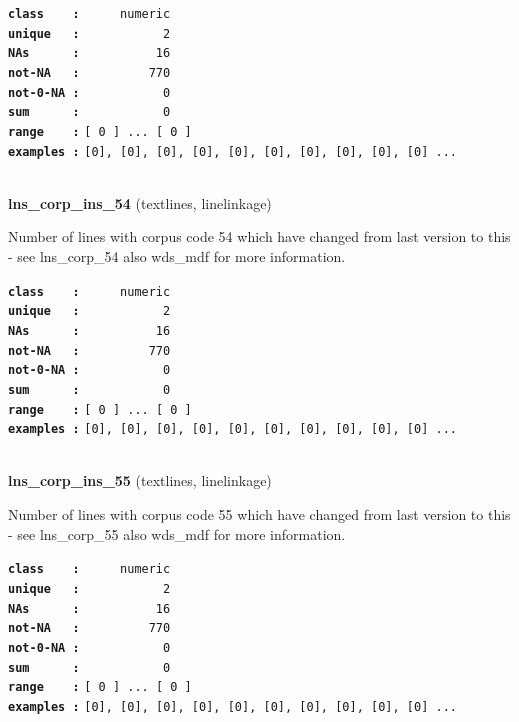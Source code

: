 \documentclass[]{article}
\begin{document}
\textbf{\texttt{class\ \ \ \ :}} \texttt{~~~~~numeric}\\
\textbf{\texttt{unique\ \ \ :}} \texttt{~~~~~~~~~~~2}\\
\textbf{\texttt{NAs\ \ \ \ \ \ :}} \texttt{~~~~~~~~~~16}\\
\textbf{\texttt{not-NA\ \ \ :}} \texttt{~~~~~~~~~770}\\
\textbf{\texttt{not-0-NA\ :}} \texttt{~~~~~~~~~~~0}\\
\textbf{\texttt{sum\ \ \ \ \ \ :}} \texttt{~~~~~~~~~~~0}\\
\textbf{\texttt{range\ \ \ \ :}}
\texttt{{[}\ 0\ {]}\ ...\ {[}\ 0\ {]}}\\
\textbf{\texttt{examples\ :}}
\texttt{{[}0{]},\ {[}0{]},\ {[}0{]},\ {[}0{]},\ {[}0{]},\ {[}0{]},\ {[}0{]},\ {[}0{]},\ {[}0{]},\ {[}0{]}\ ...}\\

~

\textbf{lns\_corp\_ins\_54} (textlines, linelinkage)

Number of lines with corpus code 54 which have changed from last version
to this - see lns\_corp\_54 also wds\_mdf for more information.

\textbf{\texttt{class\ \ \ \ :}} \texttt{~~~~~numeric}\\
\textbf{\texttt{unique\ \ \ :}} \texttt{~~~~~~~~~~~2}\\
\textbf{\texttt{NAs\ \ \ \ \ \ :}} \texttt{~~~~~~~~~~16}\\
\textbf{\texttt{not-NA\ \ \ :}} \texttt{~~~~~~~~~770}\\
\textbf{\texttt{not-0-NA\ :}} \texttt{~~~~~~~~~~~0}\\
\textbf{\texttt{sum\ \ \ \ \ \ :}} \texttt{~~~~~~~~~~~0}\\
\textbf{\texttt{range\ \ \ \ :}}
\texttt{{[}\ 0\ {]}\ ...\ {[}\ 0\ {]}}\\
\textbf{\texttt{examples\ :}}
\texttt{{[}0{]},\ {[}0{]},\ {[}0{]},\ {[}0{]},\ {[}0{]},\ {[}0{]},\ {[}0{]},\ {[}0{]},\ {[}0{]},\ {[}0{]}\ ...}\\

~

\textbf{lns\_corp\_ins\_55} (textlines, linelinkage)

Number of lines with corpus code 55 which have changed from last version
to this - see lns\_corp\_55 also wds\_mdf for more information.

\textbf{\texttt{class\ \ \ \ :}} \texttt{~~~~~numeric}\\
\textbf{\texttt{unique\ \ \ :}} \texttt{~~~~~~~~~~~2}\\
\textbf{\texttt{NAs\ \ \ \ \ \ :}} \texttt{~~~~~~~~~~16}\\
\textbf{\texttt{not-NA\ \ \ :}} \texttt{~~~~~~~~~770}\\
\textbf{\texttt{not-0-NA\ :}} \texttt{~~~~~~~~~~~0}\\
\textbf{\texttt{sum\ \ \ \ \ \ :}} \texttt{~~~~~~~~~~~0}\\
\textbf{\texttt{range\ \ \ \ :}}
\texttt{{[}\ 0\ {]}\ ...\ {[}\ 0\ {]}}\\
\textbf{\texttt{examples\ :}}
\texttt{{[}0{]},\ {[}0{]},\ {[}0{]},\ {[}0{]},\ {[}0{]},\ {[}0{]},\ {[}0{]},\ {[}0{]},\ {[}0{]},\ {[}0{]}\ ...}\\
\end{document}
